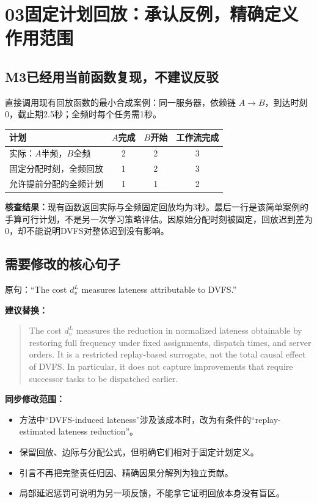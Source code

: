 \documentclass[UTF8,11pt,a4paper,fontset=fandol]{ctexart}
\newenvironment{draft}{\begin{quote}\small\setlength{\parskip}{4pt}}{\end{quote}}
\newcommand{\partpage}[2]{\section*{#1\quad #2}}
\begin{document}
\newpage
\partpage{03}{固定计划回放：承认反例，精确定义作用范围}
\subsection*{M3已经用当前函数复现，不建议反驳}
直接调用现有回放函数的最小合成案例：同一服务器，依赖链 $A\to B$，到达时刻0，截止期2.5秒；全频时每个任务需1秒。

\begin{center}
\begin{tabular}{@{}lccc@{}}
\toprule
计划 & $A$完成 & $B$开始 & 工作流完成\\\midrule
实际：$A$半频，$B$全频 & 2 & 2 & 3\\
固定分配时刻，全频回放 & 1 & 2 & 3\\
允许提前分配的全频计划 & 1 & 1 & 2\\\bottomrule
\end{tabular}
\end{center}

\textbf{核查结果：}现有函数返回实际与全频固定回放均为3秒。最后一行是该简单案例的手算可行计划，不是另一次学习策略评估。因原始分配时刻被固定，回放迟到差为0，却不能说明DVFS对整体迟到没有影响。

\subsection*{需要修改的核心句子}
原句：“The cost $d_v^L$ measures lateness attributable to DVFS.”

\textbf{建议替换：}
\begin{draft}
The cost $d_v^L$ measures the reduction in normalized lateness obtainable by restoring full frequency under fixed assignments, dispatch times, and server orders. It is a restricted replay-based surrogate, not the total causal effect of DVFS. In particular, it does not capture improvements that require successor tasks to be dispatched earlier.
\end{draft}

\textbf{同步修改范围：}
\begin{itemize}
\item 方法中“DVFS-induced lateness”涉及该成本时，改为有条件的“replay-estimated lateness reduction”。
\item 保留回放、边际与分配公式，但明确它们相对于固定计划定义。
\item 引言不再把完整责任归因、精确因果分解列为独立贡献。
\item 局部延迟惩罚可说明为另一项反馈，不能拿它证明回放本身没有盲区。
\end{itemize}
\end{document}
